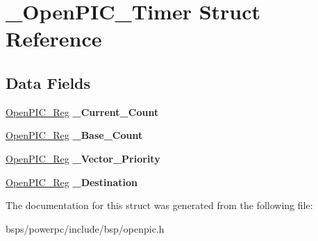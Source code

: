 \hypertarget{struct__OpenPIC__Timer}{}\section{\+\_\+\+Open\+P\+I\+C\+\_\+\+Timer Struct Reference}
\label{struct__OpenPIC__Timer}
\subsection*{Data Fields}
\begin{DoxyCompactItemize}
\item 
\mbox{\label{struct__OpenPIC__Timer_a7a28ca6386351a220dc81295efa9e543}} 
\mbox{\hyperlink{struct__OpenPIC__Reg}{Open\+P\+I\+C\+\_\+\+Reg}} {\bfseries \+\_\+\+Current\+\_\+\+Count}
\item 
\mbox{\label{struct__OpenPIC__Timer_a88c094df50c6a615ab20e7da5b9425a1}} 
\mbox{\hyperlink{struct__OpenPIC__Reg}{Open\+P\+I\+C\+\_\+\+Reg}} {\bfseries \+\_\+\+Base\+\_\+\+Count}
\item 
\mbox{\label{struct__OpenPIC__Timer_a1f180f3ee2471dc6d4bfd7235d211714}} 
\mbox{\hyperlink{struct__OpenPIC__Reg}{Open\+P\+I\+C\+\_\+\+Reg}} {\bfseries \+\_\+\+Vector\+\_\+\+Priority}
\item 
\mbox{\label{struct__OpenPIC__Timer_a5c5917027092908dbe9b24f40778badf}} 
\mbox{\hyperlink{struct__OpenPIC__Reg}{Open\+P\+I\+C\+\_\+\+Reg}} {\bfseries \+\_\+\+Destination}
\end{DoxyCompactItemize}


The documentation for this struct was generated from the following file\+:\begin{DoxyCompactItemize}
\item 
bsps/powerpc/include/bsp/openpic.\+h\end{DoxyCompactItemize}
